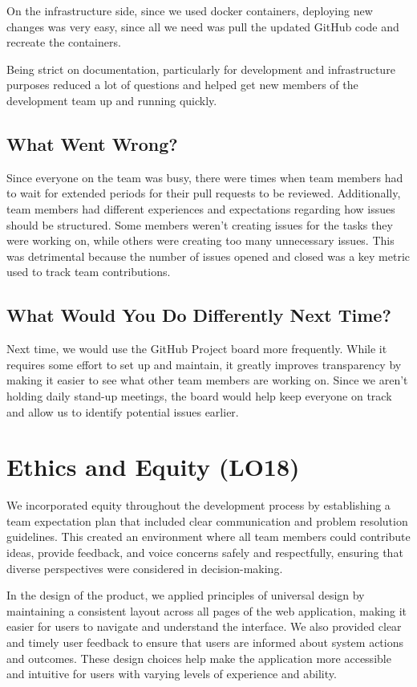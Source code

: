 \documentclass{article}
\begin{document}
On the infrastructure side, since we used docker containers, deploying new changes was very easy, since all we need was pull the updated GitHub code and recreate the containers.

Being strict on documentation, particularly for development and infrastructure purposes reduced a lot of questions and helped get new members of the development team up and running quickly.

\subsection{What Went Wrong?}

Since everyone on the team was busy, there were times when team members had to wait for extended periods for their pull requests to be reviewed. Additionally, team members had different experiences and expectations regarding how issues should be structured. Some members weren’t creating issues for the tasks they were working on, while others were creating too many unnecessary issues. This was detrimental because the number of issues opened and closed was a key metric used to track team contributions.

\subsection{What Would You Do Differently Next Time?}

Next time, we would use the GitHub Project board more frequently. While it requires some effort to set up and maintain, it greatly improves transparency by making it easier to see what other team members are working on. Since we aren’t holding daily stand-up meetings, the board would help keep everyone on track and allow us to identify potential issues earlier.

\section{Ethics and Equity (LO18)}
We incorporated equity throughout the development process by establishing a team expectation plan that included clear communication and problem resolution guidelines. This created an environment where all team members could contribute ideas, provide feedback, and voice concerns safely and respectfully, ensuring that diverse perspectives were considered in decision-making.

In the design of the product, we applied principles of universal design by maintaining a consistent layout across all pages of the web application, making it easier for users to navigate and understand the interface. We also provided clear and timely user feedback to ensure that users are informed about system actions and outcomes. These design choices help make the application more accessible and intuitive for users with varying levels of experience and ability.
\end{document}
